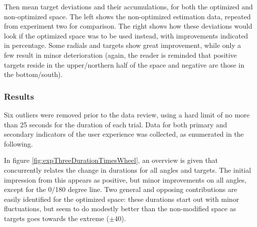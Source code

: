 \begin{table*}[!hb]
	\centering
	\hspace{-4.5cm}
	\twoFigure{
		\resizebox{9cm}{!}{		
			
		}
		\vspace*{0.2cm}
	}{
	\hspace{1.2cm}
	\resizebox{11cm}{!}{		
		
	}
}
\caption{Then mean target deviations and their accumulations, for both the optimized and non-optimized space. The left shows the non-optimized estimation data, repeated from  experiment two for comparison. The right shows how these deviations would look if the optimized space was to be used instead, with improvements indicated in percentage. Some radials and targets show great improvement, while only a few result in minor deterioration (again, the reader is reminded that positive targets reside in the upper/northern half of the space and negative are those in the bottom/south). }
\label{table:expThreeDeviationsTable}	
\end{table*}
	
	
\onecolumn
\twocolumn

\subsubsection{Results}

Six outliers were removed prior to the data review, using a hard limit of no more than 25 seconds for the duration of each trial. Data for both primary and secondary indicators of the user experience was collected, as enumerated in the following.


%
 
 
 
In figure \ref{fig:expThreeDurationTimesWheel}, an overview is given that concurrently relates the change in durations for all angles and targets. The initial impression from this appears as positive, but minor improvements on all angles, except for the 0/180 degree line. Two general and opposing contributions are easily identified for the optimized space: these durations start out with  minor fluctuations, but seem to do modestly better than the non-modified space as targets goes towards the extreme ($\pm40$). 

